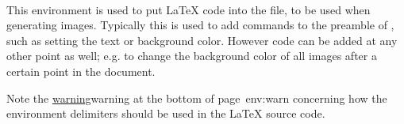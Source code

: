 \htmlrule[width=300]
%
%
\paragraph*{\label{imagesonly}}
\begin{changebar}
This environment is used to put \LaTeX{} code into the  file,
to be used when generating images. Typically this is used to add commands to
the preamble of , such as setting the text or background color.
However code can be added at any other point as well; 
e.g. to change the background color of all images after a certain point in the document. 
\end{changebar}%

\smallskip\noindent
Note the \hyperref[page]{warning}{warning at the bottom of page~}{}{env:warn}
concerning how the environment delimiters should be used in the
\LaTeX{} source code.


%
%
